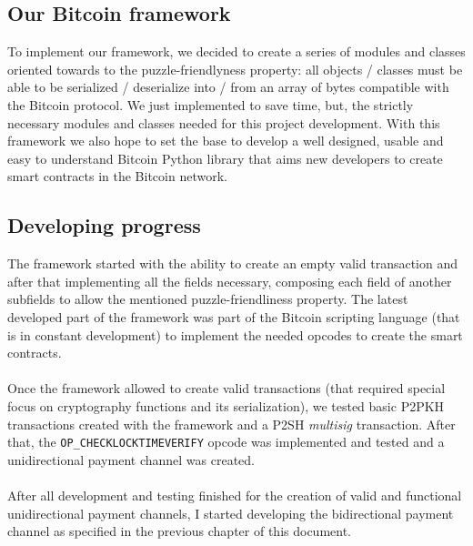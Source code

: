\documentclass[12pt,journal,compsoc]{IEEEtran}
\newcommand{\code}[1]{\texttt{#1}}
\begin{document}
\subsection{Our Bitcoin framework}
To implement our framework, we decided to create a series of modules and classes oriented towards to the puzzle-friendlyness property: all objects / classes must be able to be serialized / deserialize into / from an array of bytes compatible with the Bitcoin protocol. We just implemented to save time, but, the strictly necessary modules and classes needed for this project development. With this framework we also hope to set the base to develop a well designed, usable and easy to understand Bitcoin Python library that aims new developers to create smart contracts in the Bitcoin network.
\subsection{Developing progress}
The framework started with the ability to create an empty valid transaction and after that implementing all the fields necessary, composing each field of another subfields to allow the mentioned puzzle-friendliness property. The latest developed part of the framework was part of the Bitcoin scripting language (that is in constant development) to implement the needed opcodes to create the smart contracts.\\\\
Once the framework allowed to create valid transactions (that required special focus on cryptography functions and its serialization), we tested basic P2PKH transactions created with the framework and a P2SH \textit{multisig} transaction. After that, the \code{OP\_CHECKLOCKTIMEVERIFY} opcode was implemented and tested and a unidirectional payment channel was created.\\\\
After all development and testing finished for the creation of valid and functional unidirectional payment channels, I started developing the bidirectional payment channel as specified in the previous chapter of this document.
\end{document}
